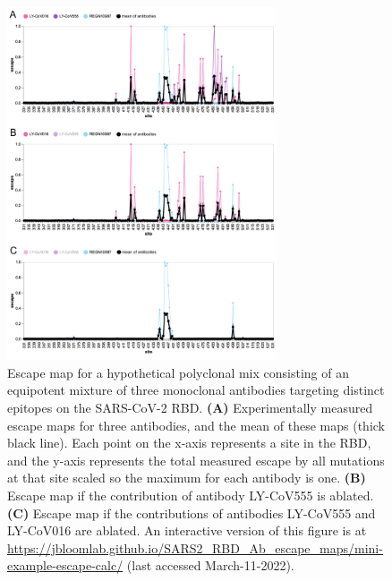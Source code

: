\documentclass[9pt,twocolumn,twoside]{gsajnl_modified}
\begin{document}
\begin{figure}
\includegraphics[width=0.71\textwidth]{figures/mini_example/mini_example.pdf} 

\caption{
Escape map for a hypothetical polyclonal mix consisting of an equipotent mixture of three monoclonal antibodies targeting distinct epitopes on the SARS-CoV-2 RBD.
{\bf (A)} Experimentally measured escape maps for three antibodies, and the mean of these maps (thick black line).
Each point on the x-axis represents a site in the RBD, and the y-axis represents the total measured escape by all mutations at that site scaled so the maximum for each antibody is one.
{\bf (B)} Escape map if the contribution of antibody LY-CoV555 is ablated.
{\bf (C)} Escape map if the contributions of antibodies LY-CoV555 and LY-CoV016 are ablated.
An interactive version of this figure is at \url{https://jbloomlab.github.io/SARS2_RBD_Ab_escape_maps/mini-example-escape-calc/} (last accessed March-11-2022).}
\label{fig:mini_example}
\end{figure}
\end{document}
